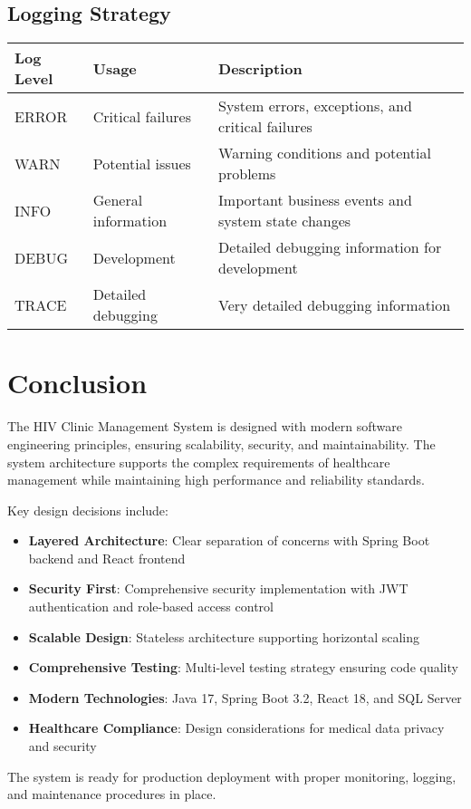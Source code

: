\documentclass[12pt,a4paper]{article}
\begin{document}
\subsection{Logging Strategy}

\begin{longtable}{|p{3cm}|p{2cm}|p{9cm}|}
\hline
\textbf{Log Level} & \textbf{Usage} & \textbf{Description} \\
\hline
ERROR & Critical failures & System errors, exceptions, and critical failures \\
\hline
WARN & Potential issues & Warning conditions and potential problems \\
\hline
INFO & General information & Important business events and system state changes \\
\hline
DEBUG & Development & Detailed debugging information for development \\
\hline
TRACE & Detailed debugging & Very detailed debugging information \\
\hline
\end{longtable}

\section{Conclusion}

The HIV Clinic Management System is designed with modern software engineering principles, ensuring scalability, security, and maintainability. The system architecture supports the complex requirements of healthcare management while maintaining high performance and reliability standards.

Key design decisions include:

\begin{itemize}
    \item \textbf{Layered Architecture}: Clear separation of concerns with Spring Boot backend and React frontend
    \item \textbf{Security First}: Comprehensive security implementation with JWT authentication and role-based access control
    \item \textbf{Scalable Design}: Stateless architecture supporting horizontal scaling
    \item \textbf{Comprehensive Testing}: Multi-level testing strategy ensuring code quality
    \item \textbf{Modern Technologies}: Java 17, Spring Boot 3.2, React 18, and SQL Server
    \item \textbf{Healthcare Compliance}: Design considerations for medical data privacy and security
\end{itemize}

The system is ready for production deployment with proper monitoring, logging, and maintenance procedures in place.
\end{document}
